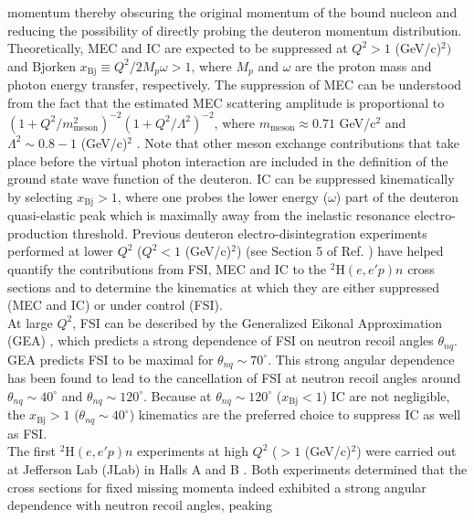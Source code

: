 \documentclass[aps,prl,twocolumn,showpacs,superscriptaddress,groupedaddress,nofootinbib]{revtex4-2}  %
\begin{document}
momentum thereby obscuring the original momentum of the bound nucleon and reducing the possibility of directly probing the deuteron momentum distribution. \\
\indent Theoretically, MEC and IC are expected to be suppressed at $Q^{2}>1$ (GeV/c)$^{2})$ and Bjorken $x_{\mathrm{Bj}}\equiv Q^{2}/2M_{p}\omega>1$, where $M_{p}$ and $\omega$ are the proton mass and photon energy transfer, respectively\cite{sargsian_2015}.
The suppression of MEC can be understood from the fact that the estimated MEC scattering amplitude is proportional to  $(1 + Q^{2}/m^{2}_{\mathrm{meson}})^{-2}(1+Q^{2}/\Lambda^{2})^{-2}$, where $m_{\mathrm{meson}}\approx0.71$ GeV/c$^{2}$ and
$\Lambda^{2}\sim 0.8-1 $ (GeV/c)$^{2}$ \cite{Sargsian_2001}. Note that other meson exchange contributions that take place before the virtual photon interaction are included in the definition of the ground state wave function of the deuteron. IC can be suppressed kinematically by selecting $x_{\mathrm{Bj}}>1$, where one probes the lower energy ($\omega$) part of the deuteron quasi-elastic peak which is maximally away from the inelastic resonance
electro-production threshold. Previous deuteron electro-disintegration experiments performed at lower $Q^{2}$ ($Q^{2}<1$ (GeV/c)$^{2}$) (see Section 5 of Ref. \cite{sargsian_2015}) have helped quantify the contributions
from FSI, MEC and IC to the $^{2}\mathrm{H}(e,e'p)n$ cross sections and to determine the kinematics at which they are either suppressed (MEC and IC) or under control (FSI).  \\
\indent At large $Q^{2}$, FSI can be described by the Generalized Eikonal Approximation (GEA) \cite{Sargsian_2001,PhysRevC.56.1124,sargsian_2015}, which predicts a strong dependence of FSI on neutron recoil angles $\theta_{nq}$.
GEA predicts FSI to be maximal for $\theta_{nq}\sim70^{\circ}$. This strong angular dependence has been found to lead to the cancellation of FSI at neutron recoil angles around $\theta_{nq}\sim40^{\circ}$ and $\theta_{nq}\sim120^{\circ}$. Because at
$\theta_{nq}\sim120^{\circ}$ ($x_{\mathrm{Bj}}<1$) IC are not negligible, the $x_{\mathrm{Bj}}>1$ ($\theta_{nq}\sim40^{\circ}$) kinematics are the preferred choice to suppress IC as well as FSI. \\
\indent The first $^{2}\mathrm{H}(e,e'p)n$ experiments at high $Q^{2}$ ($>1$ (GeV/c)$^{2}$) were carried out at Jefferson Lab (JLab) in Halls A \cite{PhysRevLett.107.262501} and B \cite{PhysRevLett.98.262502}. Both
experiments determined that the cross sections for fixed missing momenta indeed exhibited a strong angular dependence with neutron recoil angles, peaking
\end{document}
